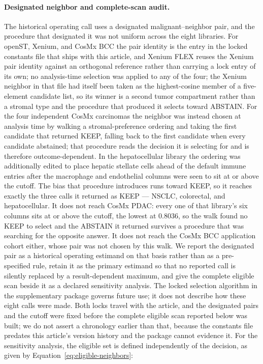 \paragraph{Designated neighbor and complete-scan audit.}
The historical operating call uses a designated malignant--neighbor pair, and the procedure that designated it was not uniform across the eight libraries. For openST, Xenium, and CosMx BCC the pair identity is the entry in the locked constants file that ships with this article, and Xenium FLEX reuses the Xenium pair identity against an orthogonal reference rather than carrying a lock entry of its own; no analysis-time selection was applied to any of the four; the Xenium neighbor in that file had itself been taken as the highest-cosine member of a five-element candidate list, so its winner is a second tumor compartment rather than a stromal type and the procedure that produced it selects toward ABSTAIN. For the four independent CosMx carcinomas the neighbor was instead chosen at analysis time by walking a stromal-preference ordering and taking the first candidate that returned KEEP, falling back to the first candidate when every candidate abstained; that procedure reads the decision it is selecting for and is therefore outcome-dependent. In the hepatocellular library the ordering was additionally edited to place hepatic stellate cells ahead of the default immune entries after the macrophage and endothelial columns were seen to sit at or above the cutoff. The bias that procedure introduces runs toward KEEP, so it reaches exactly the three calls it returned as KEEP --- NSCLC, colorectal, and hepatocellular. It does not reach CosMx PDAC: every one of that library's six columns sits at or above the cutoff, the lowest at \(0.8036\), so the walk found no KEEP to select and the ABSTAIN it returned survives a procedure that was searching for the opposite answer. It does not reach the CosMx BCC application cohort either, whose pair was not chosen by this walk. We report the designated pair as a historical operating estimand on that basis rather than as a pre-specified rule, retain it as the primary estimand so that no reported call is silently replaced by a result-dependent maximum, and give the complete eligible scan beside it as a declared sensitivity analysis. The locked selection algorithm in the supplementary package governs future use; it does not describe how these eight calls were made. Both locks travel with the article, and the designated pairs and the cutoff were fixed before the complete eligible scan reported below was built; we do not assert a chronology earlier than that, because the constants file predates this article's version history and the package cannot evidence it. For the sensitivity analysis, the eligible set is defined independently of the decision, as given by Equation~\eqref{eq:eligible-neighbors}:
